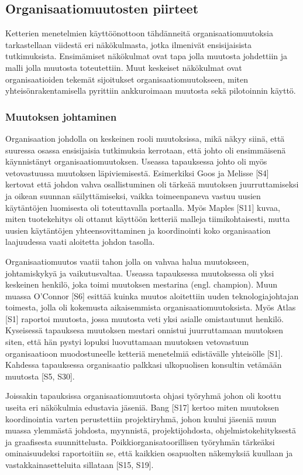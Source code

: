 \subsection{Organisaatiomuutosten piirteet}

Ketterien menetelmien käyttöönottoon tähdänneitä organisaatiomuutoksia
tarkastellaan viidestä eri näkökulmasta, jotka ilmenivät ensisijaisista
tutkimuksista. Ensimämiset näkökulmat ovat tapa jolla muutosta johdettiin ja
malli jolla muutosta toteutettiin. Muut keskeiset näkökulmat ovat
organisaatioiden tekemät sijoitukset organisaatiomuutokseen, miten
yhteisönrakentamisella pyrittiin ankkuroimaan muutosta sekä pilotoinnin käyttö.

\subsubsection{Muutoksen johtaminen}

Organisaation johdolla on keskeinen rooli muutoksissa, mikä näkyy siinä, että
suuressa osassa ensisijaisia tutkimuksia kerrotaan, että johto oli ensimmäisenä
käynnistänyt organisaatiomuutoksen. Useassa tapauksessa johto oli myös
vetovastuussa muutoksen läpiviemisestä. Esimerkiksi Goos ja Melisse [S4]
kertovat että johdon vahva osallistuminen oli tärkeää muutoksen juurruttamiseksi
ja oikean suunnan säilyttämiseksi, vaikka toimeenpaneva vastuu uusien
käytäntöjen luomisesta oli toteuttavalla portaalla. Myös Maples [S11] kuvaa,
miten tuotekehitys oli ottanut käyttöön ketteriä malleja tiimikohtaisesti, mutta
uusien käytäntöjen yhteensovittaminen ja koordinointi koko organisaation
laajuudessa vaati aloitetta johdon tasolla.

Organisaatiomuutos vaatii tahon jolla on vahvaa halua muutokseen, johtamiskykyä
ja vaikutusvaltaa. Useassa tapauksessa muutoksessa oli yksi keskeinen henkilö,
joka toimi muutoksen mestarina (engl. champion). Muun muassa O'Connor [S6]
esittää kuinka muutos aloitettiin uuden teknologiajohtajan toimesta, jolla oli
kokemusta aikaisemmista organisaatiomuutoksista. Myös Atlas [S1] raportoi
muutosta, jossa muutosta veti yksi asialle omistautunut henkilö. Kyseisessä
tapauksesa muutoksen mestari onnistui juurruttamaan muutoksen siten, että hän
pystyi lopuksi luovuttamaan muutoksen vetovastuun organisaatioon muodostuneelle
ketteriä menetelmiä edistävälle yhteisölle [S1]. Kahdessa tapauksessa
organisaatio palkkasi ulkopuolisen konsultin vetämään muutosta [S5, S30].

Joissakin tapauksissa organisaatiomuutosta ohjasi työryhmä johon oli koottu
useita eri näkökulmia edustavia jäseniä. Bang [S17] kertoo miten muutoksen
koordinointia varten perustettiin projektiryhmä, johon kuului jäseniä muun
muassa ylemmästä johdosta, myynnistä, projektijohdosta, ohjelmistokehityksestä
ja graafisesta suunnittelusta. Poikkiorganisatoorillisen työryhmän tärkeäksi
ominaisuudeksi raportoitiin se, että kaikkien osapuolten näkemyksiä kuullaan ja
vastakkainasetteluita sillataan [S15, S19].

